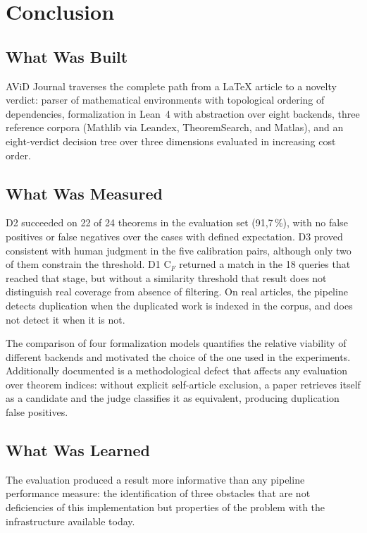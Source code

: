 \section{Conclusion}

\label{sec:conclusion}

\subsection{What Was Built}

AViD Journal traverses the complete path from a LaTeX article to a novelty verdict: parser of mathematical environments with topological ordering of dependencies, formalization in Lean~4 with abstraction over eight backends, three reference corpora (Mathlib via Leandex, TheoremSearch, and Matlas), and an eight-verdict decision tree over three dimensions evaluated in increasing cost order.

\subsection{What Was Measured}

D2 succeeded on 22 of 24 theorems in the evaluation set (91{,}7\,\%), with no false positives or false negatives over the cases with defined expectation. D3 proved consistent with human judgment in the five calibration pairs, although only two of them constrain the threshold. D1 C$_F$ returned a match in the 18 queries that reached that stage, but without a similarity threshold that result does not distinguish real coverage from absence of filtering. On real articles, the pipeline detects duplication when the duplicated work is indexed in the corpus, and does not detect it when it is not.

The comparison of four formalization models quantifies the relative viability of different backends and motivated the choice of the one used in the experiments. Additionally documented is a methodological defect that affects any evaluation over theorem indices: without explicit self-article exclusion, a paper retrieves itself as a candidate and the judge classifies it as equivalent, producing duplication false positives.

\subsection{What Was Learned}

The evaluation produced a result more informative than any pipeline performance measure: the identification of three obstacles that are not deficiencies of this implementation but properties of the problem with the infrastructure available today.

